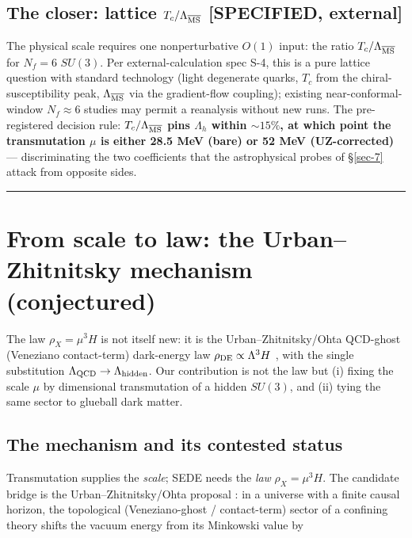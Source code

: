 \documentclass[preprint,12pt]{elsarticle}
\begin{document}
\subsection{\texorpdfstring{The closer: lattice
\(T_c/\Lambda_{\overline{\rm MS}}\) {[}SPECIFIED,
external{]}}{The closer: lattice  {[}SPECIFIED, external{]}}}\label{sec-3-4}

The physical scale requires one nonperturbative \(O(1)\) input: the
ratio \(T_c/\Lambda_{\overline{\rm MS}}\) for \(N_f = 6\) \(SU(3)\). Per
external-calculation spec S-4, this is a pure lattice question with
standard technology (light degenerate quarks, \(T_c\) from the
chiral-susceptibility peak, \(\Lambda_{\overline{\rm MS}}\) via the
gradient-flow coupling); existing near-conformal-window
\(N_f \approx 6\) studies may permit a reanalysis without new runs. The
pre-registered decision rule:
\textbf{\(T_c/\Lambda_{\overline{\rm MS}}\) pins \(\Lambda_h\) within
\(\sim 15\%\), at which point the transmutation \(\mu\) is either 28.5
MeV (bare) or 52 MeV (UZ-corrected)} --- discriminating the two
coefficients that the astrophysical probes of §\ref{sec-7} attack from
opposite sides.

\begin{center}\rule{0.5\linewidth}{0.5pt}\end{center}

\section{From scale to law: the Urban--Zhitnitsky mechanism
(conjectured)}\label{sec-4}

The law \(\rho_X = \mu^3 H\) is not itself new: it is the
Urban--Zhitnitsky/Ohta QCD-ghost (Veneziano contact-term) dark-energy
law \(\rho_{\rm DE} \propto \Lambda^3 H\)
\citep{Urban:2009vy, Urban:2009yg, Ohta:2010in, Cai:2010uf, Cai:2012fq},
with the single substitution
\(\Lambda_{\rm QCD} \to \Lambda_{\rm hidden}\). Our contribution is not
the law but (i) fixing the scale \(\mu\) by dimensional transmutation of
a hidden \(SU(3)\), and (ii) tying the same sector to glueball dark
matter.

\subsection{The mechanism and its contested status}\label{sec-4-1}

Transmutation supplies the \emph{scale}; SEDE needs the \emph{law}
\(\rho_X = \mu^3 H\). The candidate bridge is the Urban--Zhitnitsky/Ohta
proposal \citep{Urban:2009vy, Urban:2009yg, Urban:2009sw, Ohta:2010in}:
in a universe with a finite causal horizon, the topological
(Veneziano-ghost / contact-term) sector of a confining theory shifts the
vacuum energy from its Minkowski value by
\end{document}
